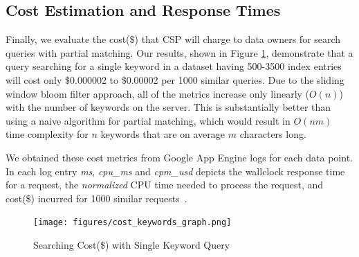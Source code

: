 \subsection{Cost Estimation and Response Times}

Finally, we evaluate the cost(\$) that CSP will charge to data owners for search
queries with partial matching. 
Our results, shown in Figure \ref{fig:cost_single_query}, demonstrate that a query
searching for a single keyword in a dataset having 500-3500 index entries will cost only \$0.000002 to \$0.00002 per 1000 similar
queries. Due to the sliding window bloom filter approach, 
all of the metrics increase only linearly ($O(n)$) with the number
of keywords on the server. This is substantially better than using a naive algorithm 
for partial matching, which would result in $O(nm)$ time complexity 
for $n$ keywords that are on average $m$ characters long.

We obtained these cost metrics from Google App Engine logs for each data point. In
each log entry \emph{ms}, \emph{cpu\_ms} and \emph{cpm\_usd} depicts the wallclock response
time for a request, the \emph{normalized} CPU time needed to process the
request, and cost(\$) incurred for 1000 similar requests~\cite{google_cloud_logs}.


\begin{figure}
  \centering
  \texttt{[image: figures/cost\_keywords\_graph.png]}
  \caption{Searching Cost(\$) with Single Keyword Query}
  \label{fig:cost_single_query}
\end{figure}
